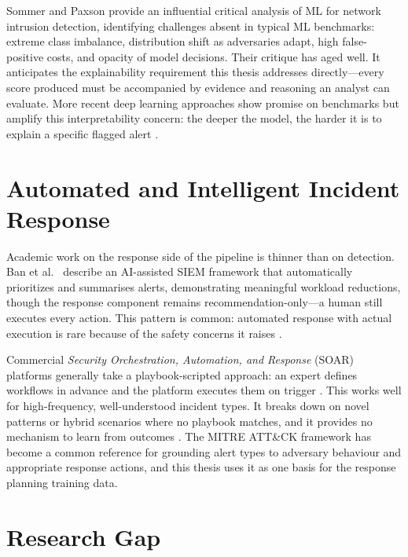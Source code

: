 Sommer and Paxson \cite{sommer2010outside} provide an influential critical analysis of ML for network intrusion detection, identifying challenges absent in typical ML benchmarks: extreme class imbalance, distribution shift as adversaries adapt, high false-positive costs, and opacity of model decisions. Their critique has aged well. It anticipates the explainability requirement this thesis addresses directly---every score produced must be accompanied by evidence and reasoning an analyst can evaluate. More recent deep learning approaches \cite{du2017deeplog, scarselli2009gnn, vaswani2017attention} show promise on benchmarks but amplify this interpretability concern: the deeper the model, the harder it is to explain a specific flagged alert \cite{sommer2010outside, tilbury2024humans}.

\section{Automated and Intelligent Incident Response}

Academic work on the response side of the pipeline is thinner than on detection. Ban et al.\ \cite{ban2023alertfatigue} describe an AI-assisted SIEM framework that automatically prioritizes and summarises alerts, demonstrating meaningful workload reductions, though the response component remains recommendation-only---a human still executes every action. This pattern is common: automated response with actual execution is rare because of the safety concerns it raises \cite{tilbury2024humans, nist80061}.

Commercial \textit{Security Orchestration, Automation, and Response} (SOAR) platforms generally take a playbook-scripted approach: an expert defines workflows in advance and the platform executes them on trigger \cite{nist80061, tilbury2024humans}. This works well for high-frequency, well-understood incident types. It breaks down on novel patterns or hybrid scenarios where no playbook matches, and it provides no mechanism to learn from outcomes \cite{tilbury2024humans}. The MITRE ATT\&CK framework \cite{strom2018attack} has become a common reference for grounding alert types to adversary behaviour and appropriate response actions, and this thesis uses it as one basis for the response planning training data.

\section{Research Gap}

